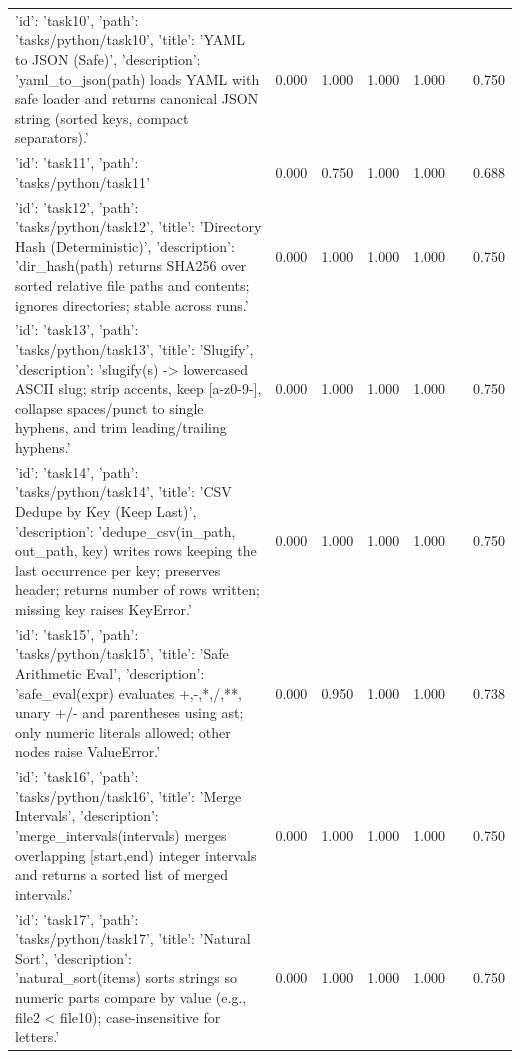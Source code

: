 \begin{tabular}{lrrrrrr}
{'id': 'task10', 'path': 'tasks/python/task10', 'title': 'YAML to JSON (Safe)', 'description': 'yaml\_to\_json(path) loads YAML with safe loader and returns canonical JSON string (sorted keys, compact separators).'} & 0.000 & 1.000 & 1.000 & 1.000 &  & 0.750 \\
{'id': 'task11', 'path': 'tasks/python/task11'} & 0.000 & 0.750 & 1.000 & 1.000 &  & 0.688 \\
{'id': 'task12', 'path': 'tasks/python/task12', 'title': 'Directory Hash (Deterministic)', 'description': 'dir\_hash(path) returns SHA256 over sorted relative file paths and contents; ignores directories; stable across runs.'} & 0.000 & 1.000 & 1.000 & 1.000 &  & 0.750 \\
{'id': 'task13', 'path': 'tasks/python/task13', 'title': 'Slugify', 'description': 'slugify(s) -> lowercased ASCII slug; strip accents, keep [a-z0-9-], collapse spaces/punct to single hyphens, and trim leading/trailing hyphens.'} & 0.000 & 1.000 & 1.000 & 1.000 &  & 0.750 \\
{'id': 'task14', 'path': 'tasks/python/task14', 'title': 'CSV Dedupe by Key (Keep Last)', 'description': 'dedupe\_csv(in\_path, out\_path, key) writes rows keeping the last occurrence per key; preserves header; returns number of rows written; missing key raises KeyError.'} & 0.000 & 1.000 & 1.000 & 1.000 &  & 0.750 \\
{'id': 'task15', 'path': 'tasks/python/task15', 'title': 'Safe Arithmetic Eval', 'description': 'safe\_eval(expr) evaluates +,-,*,/,**, unary +/- and parentheses using ast; only numeric literals allowed; other nodes raise ValueError.'} & 0.000 & 0.950 & 1.000 & 1.000 &  & 0.738 \\
{'id': 'task16', 'path': 'tasks/python/task16', 'title': 'Merge Intervals', 'description': 'merge\_intervals(intervals) merges overlapping [start,end) integer intervals and returns a sorted list of merged intervals.'} & 0.000 & 1.000 & 1.000 & 1.000 &  & 0.750 \\
{'id': 'task17', 'path': 'tasks/python/task17', 'title': 'Natural Sort', 'description': 'natural\_sort(items) sorts strings so numeric parts compare by value (e.g., file2 < file10); case-insensitive for letters.'} & 0.000 & 1.000 & 1.000 & 1.000 &  & 0.750 \\
\bottomrule
\end{tabular}
